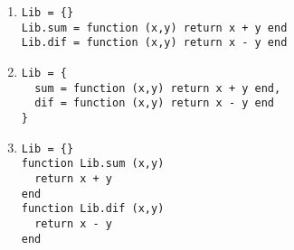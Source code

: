 \begin{enumerate}
	\item 

\begin{lstlisting}
Lib = {}
Lib.sum = function (x,y) return x + y end
Lib.dif = function (x,y) return x - y end
\end{lstlisting}

	\item 
	
\begin{lstlisting}
Lib = {
  sum = function (x,y) return x + y end,
  dif = function (x,y) return x - y end
}
\end{lstlisting}

	\item  
	
\begin{lstlisting}
Lib = {}
function Lib.sum (x,y)
  return x + y
end
function Lib.dif (x,y)
  return x - y
end
\end{lstlisting}

\end{enumerate}

